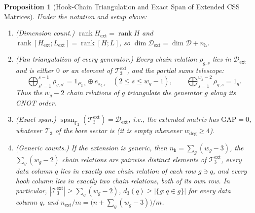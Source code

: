 \documentclass[12pt]{article}
\newtheorem{proposition}{Proposition}
\theoremstyle{definition}
\newcommand{\Ftwo}{\mathbb{F}_2}
\DeclareMathOperator{\rank}{rank}
\newcommand{\Dc}{\mathcal{D}}
\newcommand{\Tc}{\mathcal{T}_3}
\begin{document}
\begin{proposition}[Hook-Chain Triangulation and Exact Span of Extended CSS Matrices]\label{prop:hook_chain}
Under the notation and setup above:
\begin{enumerate}[label=(\alph*)]
  \item \emph{(Dimension count.)} $\rank H_{\mathrm{ext}} = \rank H$ and $\rank [H_{\mathrm{ext}}; L_{\mathrm{ext}}]
    = \rank [H; L]$, so $\dim \Dc_{\mathrm{ext}} = \dim \Dc + n_{\mathrm{h}}$.
  \item \emph{(Fan triangulation of every generator.)} Every chain relation $\rho_{g,s}$ lies in
    $\Dc_{\mathrm{ext}}$ and is either $0$ or an element of $\Tc^{\mathrm{ext}}$, and the partial sums telescope:
    \begin{equation}\label{eq:chain_telescope}
      \bigoplus_{s'=1}^{s-1} \rho_{g,s'} = 1_{P_{g,s}} \oplus e_{\pi_{g,s}} \quad (2 \le s \le w_g - 1), \qquad
      \bigoplus_{s=1}^{w_g-2} \rho_{g,s} = 1_g.
    \end{equation}
    Thus the $w_g - 2$ chain relations of $g$ triangulate the generator $g$ along its CNOT order.
  \item \emph{(Exact span.)} $\operatorname{span}_{\Ftwo}(\Tc^{\mathrm{ext}}) = \Dc_{\mathrm{ext}}$, i.e., the extended
    matrix has $\mathrm{GAP} = 0$, whatever $\Tc$ of the bare sector is (it is empty whenever $w_{\deg} \ge 4$).
  \item \emph{(Generic counts.)} If the extension is generic, then $n_{\mathrm{h}} = \sum_g (w_g - 3)$, the
    $\sum_g (w_g - 2)$ chain relations are pairwise distinct elements of $\Tc^{\mathrm{ext}}$, every data column $q$
    lies in exactly one chain relation of each row $g \ni q$, and every hook column lies in exactly two chain
    relations, both of its own row. In particular, $|\Tc^{\mathrm{ext}}| \ge \sum_g (w_g - 2)$, $d_3(q) \ge |\{g : q
    \in g\}|$ for every data column $q$, and $n_{\mathrm{ext}} / m = \bigl(n + \sum_g (w_g - 3)\bigr) / m$.
\end{enumerate}
\end{proposition}
\end{document}
